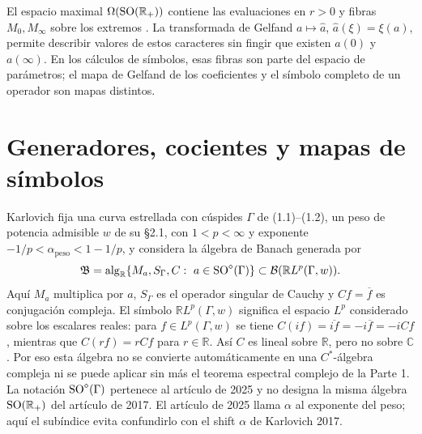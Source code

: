 El espacio maximal $\Omega(\operatorname{SO}(\mathbb R_+))$ contiene las evaluaciones
en $r>0$ y fibras $M_0,M_\infty$ sobre los extremos
\cite[§2, p.~466]{Karlovich2017}. La transformada de Gelfand
$a\mapsto\widehat a$, $\widehat a(\xi)=\xi(a)$, permite describir
valores de estos caracteres sin fingir que existen $a(0)$ y
$a(\infty)$. En los cálculos de símbolos, esas fibras son parte del
espacio de parámetros; el mapa de Gelfand de los coeficientes y el
símbolo completo de un operador son mapas distintos.

\section{Generadores, cocientes y mapas de símbolos}

Karlovich \cite[ec.~(1.4), p.~3]{Karlovich2025} fija una curva estrellada
con cúspides $\Gamma$ de (1.1)--(1.2), un peso de potencia admisible $w$
de su §2.1, con $1<p<\infty$ y exponente
$-1/p<\alpha_{\mathrm{peso}}<1-1/p$, y considera la álgebra
de Banach generada por
\[
 \mathfrak B=
 \operatorname{alg}_{\mathbb R}
 \{M_a,S_\Gamma,C:\ a\in\operatorname{SO}^\diamond(\Gamma)\}
 \subset\mathcal B(\mathbb RL^p(\Gamma,w)).
\]
Aquí $M_a$ multiplica por $a$, $S_\Gamma$ es el operador singular de
Cauchy y $Cf=\overline f$ es conjugación compleja. El símbolo
$\mathbb RL^p(\Gamma,w)$ significa el espacio $L^p$ considerado sobre
los escalares reales: para $f\in L^p(\Gamma,w)$ se tiene
$C(if)=\overline{if}=-i\overline f=-iCf$, mientras que
$C(rf)=rCf$ para $r\in\mathbb R$. Así $C$ es lineal sobre
$\mathbb R$, pero no sobre $\mathbb C$. Por eso esta álgebra no se convierte automáticamente en una
$C^*$-álgebra compleja ni se puede aplicar sin más el teorema espectral
complejo de la Parte 1. La notación $\operatorname{SO}^\diamond(\Gamma)$ pertenece
al artículo de 2025 y no designa la misma álgebra
$\operatorname{SO}(\mathbb R_+)$ del artículo de 2017.
El artículo de 2025 llama $\alpha$ al exponente del peso; aquí el
subíndice evita confundirlo con el shift $\alpha$ de Karlovich 2017.

\begin{center}
\end{center}

